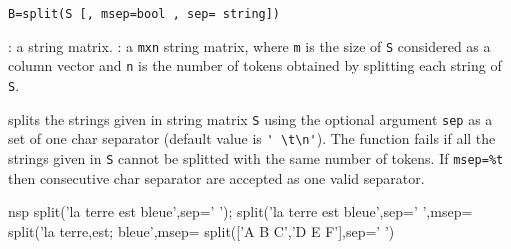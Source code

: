 
\begin{mandesc}
\end{mandesc}
\begin{calling_sequence}
\begin{verbatim}
B=split(S [, msep=bool , sep= string]) 
\end{verbatim}
\end{calling_sequence}

\begin{parameters}
  \begin{varlist}
    : a string matrix.
    : a \verb+mxn+ string matrix, where \verb+m+ is the size 
    of \verb+S+ considered as a column vector and \verb+n+ is the number 
    of tokens obtained by splitting each string of \verb+S+.
  \end{varlist}
\end{parameters}

\begin{mandescription}
splits the strings given in string matrix \verb+S+
using the optional argument \verb+sep+ as a set of one char separator 
(default value is \verb+' \t\n'+). The function fails if all the 
strings given in \verb+S+ cannot be splitted with the same number of tokens. 
If \verb+msep=%t+ then consecutive char
separator are accepted as one valid separator. 
\end{mandescription}

\begin{examples}
  \begin{mintednsp}{nsp}
    split('la terre est bleue',sep=' ');
    split('la terre est   bleue',sep=' ',msep=%
    split('la terre,est; bleue',msep=%
    split(['A B C','D E F'],sep=' ')
  \end{mintednsp}
\end{examples}


